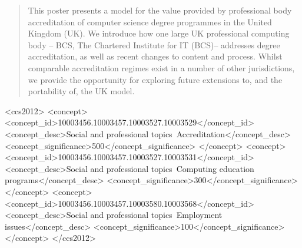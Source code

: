 \documentclass[sigconf]{acmart}
\begin{document}
%
\begin{abstract}
This poster presents a model for the value provided by professional
body accreditation of computer science degree programmes in the United
Kingdom (UK). We introduce how one large UK professional computing
body -- BCS, The Chartered Institute for IT (BCS)-- addresses degree
accreditation, as well as recent changes to content and process. Whilst
comparable accreditation regimes exist in a number of other
jurisdictions, we provide the opportunity for exploring future
extensions to, and the portability of, the UK model.

\end{abstract}

%
%
\begin{CCSXML}
	<ccs2012>
	<concept>
	<concept_id>10003456.10003457.10003527.10003529</concept_id>
	<concept_desc>Social and professional topics~Accreditation</concept_desc>
	<concept_significance>500</concept_significance>
	</concept>
	<concept>
	<concept_id>10003456.10003457.10003527.10003531</concept_id>
	<concept_desc>Social and professional topics~Computing education programs</concept_desc>
	<concept_significance>300</concept_significance>
	</concept>
	<concept>
	<concept_id>10003456.10003457.10003580.10003568</concept_id>
	<concept_desc>Social and professional topics~Employment issues</concept_desc>
	<concept_significance>100</concept_significance>
	</concept>
	</ccs2012>
\end{CCSXML}




%
\maketitle

\end{document}
